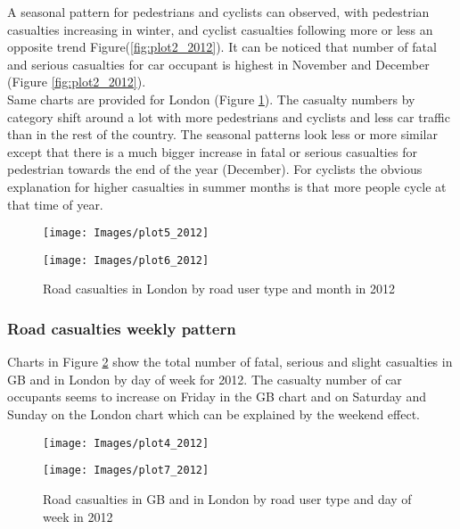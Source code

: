 \documentclass{article}
\begin{document}
 
A seasonal pattern for pedestrians and cyclists can observed, with pedestrian casualties increasing in winter, and cyclist casualties following more or less an opposite trend Figure(\ref{fig:plot2_2012}). It can be noticed that number of fatal and serious casualties for car occupant is highest in November and December (Figure \ref{fig:plot2_2012}).\\


Same charts are provided for London (Figure \ref{fig:plot5_2012}). The casualty numbers by category shift around a lot with more pedestrians and cyclists and less car traffic than in the rest of the country. The seasonal patterns look less or more similar except that there is a much bigger increase in fatal or serious casualties for pedestrian towards the end of the year (December). For cyclists the obvious explanation for higher casualties in summer months is that more people cycle at that time of year. 

\begin{figure}[!h]
\vspace{-0.5cm}
\hspace{-1cm}
\begin{minipage}[b]{.46\linewidth}
  \centering
    \texttt{[image: Images/plot5\_2012]}
\end{minipage}
\hspace{1cm}
\begin{minipage}[b]{0.46\linewidth}
  \centering
     \texttt{[image: Images/plot6\_2012]}
\end{minipage}
\caption{Road casualties in London by road user type and month in 2012 }  
 \label{fig:plot5_2012}
 \end{figure}


\subsubsection*{Road casualties weekly pattern}

Charts in Figure \ref{fig:plot4_2012} show the total number of fatal, serious and slight casualties in GB and in London by day of week for 2012. The casualty number of car occupants seems to increase on Friday in the GB chart and on Saturday and Sunday on the London chart which can be explained by the weekend effect.

\begin{figure}[H]
\hspace{-1cm}
\begin{minipage}[b]{.46\linewidth}
  \centering
    \texttt{[image: Images/plot4\_2012]}
\end{minipage}
\hspace{1cm}
\begin{minipage}[b]{0.46\linewidth}
  \centering
     \texttt{[image: Images/plot7\_2012]}
\end{minipage}
\caption{Road casualties in GB and in London by road user type and day of week in 2012 }  
 \label{fig:plot4_2012}
 \end{figure}
\end{document}
